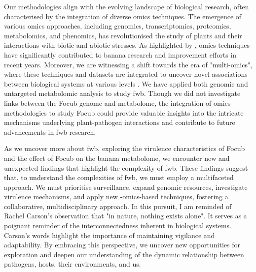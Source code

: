 Our methodologies align with the evolving landscape of biological research, often characterised by the integration of diverse omics techniques. The emergence of various omics approaches, including genomics, transcriptomics, proteomics, metabolomics, and phenomics, has revolutionised the study of plants and their interactions with biotic and abiotic stresses. As highlighted by \textcite{Backiyarani2022}, omics techniques have significantly contributed to banana research and improvement efforts in recent years. Moreover, we are witnessing a shift towards the era of "multi-omics", where these techniques and datasets are integrated to uncover novel associations between biological systems at various levels \parencite{Hasin2017}. We have applied both genomic and untargeted metabolomic analysis to study \ac{fwb}. Though we did not investigate links between the \ac{Focub} genome and metabolome, the integration of omics methodologies to study \ac{Focub} could provide valuable insights into the intricate mechanisms underlying plant-pathogen interactions and contribute to future advancements in \ac{fwb} research. 

As we uncover more about \ac{fwb}, exploring the virulence characteristics of \ac{Focub} and the effect of \ac{Focub} on the banana metabolome, we encounter new and unexpected findings that highlight the complexity of \ac{fwb}. These findings suggest that, to understand the complexities of \ac{fwb}, we must employ a multifaceted approach. We must prioritise surveillance, expand genomic resources, investigate virulence mechanisms, and apply new -omics-based techniques, fostering a collaborative, multidisciplinary approach. In this pursuit, I am reminded of Rachel Carson's observation that "in nature, nothing exists alone". It serves as a poignant reminder of the interconnectedness inherent in biological systems. Carson's words highlight the importance of maintaining vigilance and adaptability. By embracing this perspective, we uncover new opportunities for exploration and deepen our understanding of the dynamic relationship between pathogens, hosts, their environments, and us.



